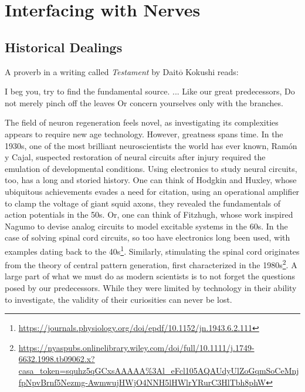 \documentclass[12pt]{report}
\begin{document}
\chapter{Interfacing with Nerves}


\section{Historical Dealings}

\label{sec:HistoricalDealings}

A proverb in a writing called \textit{Testament} by Dait$\overline{\mathrm{o}}$ Kokushi reads:\newline

\hspace*{1cm} I beg you, try to find the fundamental source.\newline
\hspace*{1cm} ...\newline
\hspace*{1cm} Like our great predecessors,\newline 
\hspace*{1cm} Do not merely pinch off the leaves\newline
\hspace*{1cm} Or concern yourselves only with the branches.\newline 

The field of neuron regeneration feels novel, as investigating its complexities appears to require new age technology. However, greatness spans time. In the 1930s, one of the most brilliant neuroscientists the world has ever known, Ramón y Cajal, suspected restoration of neural circuits after injury required the emulation of developmental conditions. Using electronics to study neural circuits, too, has a long and storied history. One can think of Hodgkin and Huxley, whose ubiquitous achievements evades a need for citation, using an operational amplifier to clamp the voltage of giant squid axons, they revealed the fundamentals of action potentials in the 50s. Or, one can think of Fitzhugh, whose work inspired Nagumo to devise analog circuits to model excitable systems in the 60s. In the case of solving spinal cord circuits, so too have electronics long been used, with examples dating back to the 40s\footnote{\url{https://journals.physiology.org/doi/epdf/10.1152/jn.1943.6.2.111}}. Similarly, stimulating the spinal cord originates from the theory of central pattern generation, first characterized in the 1980s\footnote{\url{https://nyaspubs.onlinelibrary.wiley.com/doi/full/10.1111/j.1749-6632.1998.tb09062.x?casa_token=squhz5qGCxsAAAAA\%3Al_eFcl105AQAUdyUlZoGqmSoCeMnjfpNpvBrnf5Nezmg-AwmwujHWjO4NNH5lHWlrYRurC3HlTbh8phW}}. A large part of what we must do as modern scientists is to not forget the questions posed by our predecessors. While they were limited by technology in their ability to investigate, the validity of their curiosities can never be lost.\newline
\end{document}
